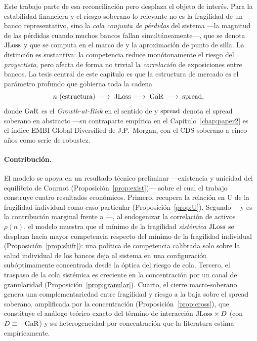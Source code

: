 Este trabajo parte de esa reconciliación pero desplaza el objeto de interés. Para la estabilidad financiera y el riesgo soberano lo relevante no es la fragilidad de un banco representativo, sino la \textit{cola conjunta de pérdidas} del sistema —la magnitud de las pérdidas cuando muchos bancos fallan simultáneamente—, que se denota $\mathrm{JLoss}$ y que se computa en el marco de \citet{Merton1974} y la aproximación de punto de silla. La distinción es sustantiva: la competencia reduce monótonamente el riesgo del \textit{proyectista}, pero afecta de forma no trivial la \textit{correlación} de exposiciones entre bancos. La tesis central de este capítulo es que la estructura de mercado es el parámetro profundo que gobierna toda la cadena
\begin{equation*}
n\ (\text{estructura}) \;\longrightarrow\; \mathrm{JLoss} \;\longrightarrow\; \mathrm{GaR} \;\longrightarrow\; \mathrm{spread},
\end{equation*}
donde $\mathrm{GaR}$ es el \textit{Growth-at-Risk} en el sentido de \citet{ABG2019} y $\mathrm{spread}$ denota el spread soberano en abstracto —su contraparte empírica en el Capítulo~\ref{chap:paper2} es el índice EMBI Global Diversified de J.P.\ Morgan, con el CDS soberano a cinco años como serie de robustez.

\paragraph{Contribución.} El modelo se apoya en un resultado técnico preliminar —existencia y unicidad del equilibrio de Cournot (Proposición~\ref{prop:exist})— sobre el cual el trabajo construye cuatro resultados económicos. Primero, recupera la relación en U de la fragilidad individual como caso particular (Proposición~\ref{prop:U}). Segundo ---y es la contribución marginal frente a \citet{MMR2010}---, al endogenizar la correlación de activos $\rho(n)$, el modelo muestra que el mínimo de la fragilidad \textit{sistémica} $\mathrm{JLoss}$ se desplaza hacia mayor competencia respecto del mínimo de la fragilidad individual (Proposición~\ref{prop:shift}): una política de competencia calibrada solo sobre la salud individual de los bancos deja al sistema en una configuración subóptimamente concentrada desde la óptica del riesgo de cola. Tercero, el traspaso de la cola sistémica es creciente en la concentración por un canal de granularidad (Proposición~\ref{prop:granular}). Cuarto, el cierre macro-soberano genera una complementariedad entre fragilidad y riesgo a la baja sobre el spread soberano, amplificada por la concentración (Proposición~\ref{prop:cross}), que constituye el análogo teórico exacto del término de interacción $\mathrm{JLoss}\times D$ (con $D\equiv-\mathrm{GaR}$) y su heterogeneidad por concentración que la literatura estima empíricamente.

